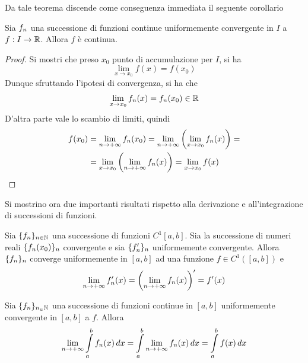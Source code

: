 Da tale teorema discende come conseguenza immediata il seguente corollario
\begin{corollary} \label{Cor: Corollario a scambio limiti}
    Sia $f_n$ una successione di funzioni continue uniformemente convergente in $I$ a $f:I \to \mathbb{R}$. Allora $f$ è continua. 
\end{corollary}
\begin{proof}
    Si mostri che preso $x_0$ punto di accumulazione per $I$, si ha
    \begin{equation}
        \lim_{x \to x_0}{f(x)}= f(x_0)
    \end{equation}
    Dunque sfruttando l'ipotesi di convergenza, si ha che
    \begin{equation}
        \lim_{x \to x_0}{f_n(x)}= f_n(x_0) \in \mathbb{R}
    \end{equation}
    D'altra parte vale lo scambio di limiti, quindi
    \begin{equation}
    \begin{aligned}
          f(x_0) &=  \lim_{n \to +\infty}{f_n(x_0)}= \lim_{n \to +\infty}{\left(\lim_{x \to x_0}{f_n(x)}\right)}=\\
          &= \lim_{x \to x_0}{ \left( \lim_{n \to +\infty}{f_n(x)}\right)}=\lim_{x \to x_0}{f(x)} 
    \end{aligned}
    \end{equation}
\end{proof}
Si mostrino ora due importanti risultati rispetto alla derivazione e all'integrazione di successioni di funzioni.
\begin{theorem} \label{Teo: Passaggio al limite sotto al segno di derivata}
    Sia $\{f_n\}_{n\in\mathbb{N}}$ una successione di funzioni $C^1[a,b]$. Sia la successione di numeri reali $\{f_n(x_0)\}_n$ convergente e sia $\{f_n'\}_n$ uniformemente convergente. Allora $\{f_n\}_n$ converge uniformemente in $[a,b]$ ad una funzione $f \in C^1([a,b])$ e 
    \begin{equation}
        \lim_{n \to +\infty}{f_n'(x)}= \left(\lim_{n \to +\infty}{f_n(x)}\right)'=f'(x)
    \end{equation}
\end{theorem}
\begin{theorem} \label{Teo: Passaggio al limite sotto al segno di integrale}
Sia $\{f_n\}_{n_\in \mathbb{N}}$ una successione di funzioni continue in $[a,b]$ uniformemente convergente in $[a,b]$ a $f$. Allora
\begin{equation}
    \lim_{n \to +\infty}{\int\limits_{a}^{b}{f_n(x)}\,dx}=\int\limits_{a}^{b}{\lim_{n \to +\infty}{f_n(x)}\,dx}= \int\limits_{a}^{b}{f(x)}\,dx
\end{equation}
\end{theorem}
